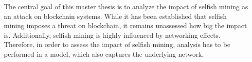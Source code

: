 The central goal of this master thesis is to analyze the impact of selfish mining as an attack on blockchain systems. 
While it has been established that selfish mining imposes a threat on blockchain, it remains unassessed how big the impact is. 
Additionally, selfish mining is highly influenced by networking effects. 
Therefore, in order to assess the impact of selfish mining, analysis has to be performed in a model, which also captures the underlying network.





